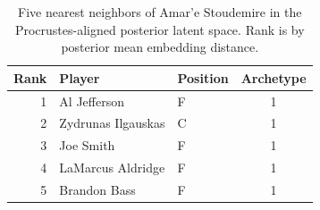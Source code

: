 \begin{table}[htbp]
  \centering\small
  \begin{tabular}{rllc}
    \toprule
    Rank & Player & Position & Archetype \\
    \midrule
    1 & Al Jefferson & F & 1 \\
    2 & Zydrunas Ilgauskas & C & 1 \\
    3 & Joe Smith & F & 1 \\
    4 & LaMarcus Aldridge & F & 1 \\
    5 & Brandon Bass & F & 1 \\
    \bottomrule
  \end{tabular}
  \caption{Five nearest neighbors of Amar'e Stoudemire in the Procrustes-aligned posterior latent space. Rank is by posterior mean embedding distance.}
  \label{tab:Amar_e_Stoudemire_neighbors}
\end{table}

